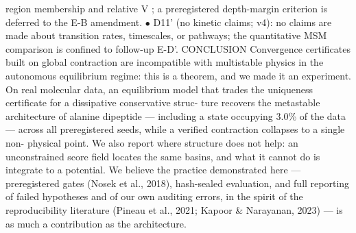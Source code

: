 \documentclass{article}
\begin{document}
region membership and relative V ; a preregistered depth-margin criterion is deferred to the
E-B amendment.
$\bullet$  D11' (no kinetic claims; v4): no claims are made about transition rates, timescales, or
pathways; the quantitative MSM comparison is confined to follow-up E-D'.
CONCLUSION
Convergence certificates built on global contraction are incompatible with multistable physics in the
autonomous equilibrium regime: this is a theorem, and we made it an experiment. On real molecular
data, an equilibrium model that trades the uniqueness certificate for a dissipative conservative struc-
ture recovers the metastable architecture of alanine dipeptide --- including a state occupying 3.0\%
of the data --- across all preregistered seeds, while a verified contraction collapses to a single non-
physical point. We also report where structure does not help: an unconstrained score field locates the
same basins, and what it cannot do is integrate to a potential. We believe the practice demonstrated
here --- preregistered gates (Nosek et al., 2018), hash-sealed evaluation, and full reporting of failed
hypotheses and of our own auditing errors, in the spirit of the reproducibility literature (Pineau et al.,
2021; Kapoor \& Narayanan, 2023) --- is as much a contribution as the architecture.
\clearpage

\end{document}
